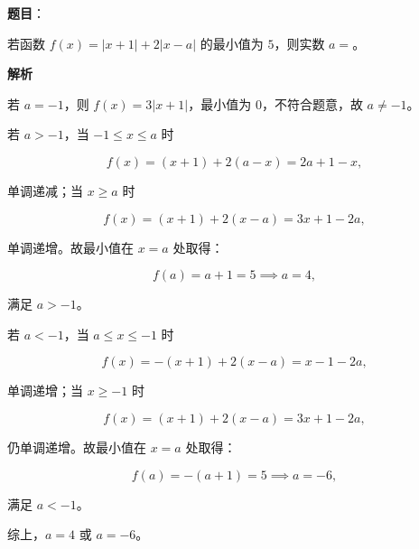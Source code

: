\begin{answer}

\textbf{题目}：

若函数 $f(x)=|x+1|+2|x-a|$ 的最小值为 $5$，则实数 $a=$\gkblank{}。

\textbf{解析}

若 $a=-1$，则 $f(x)=3|x+1|$，最小值为 $0$，不符合题意，故 $a\ne -1$。

若 $a>-1$，当 $-1\le x\le a$ 时

\nopagebreak[4]
\[
f(x)=(x+1)+2(a-x)=2a+1-x,
\]

单调递减；当 $x\ge a$ 时

\nopagebreak[4]
\[
f(x)=(x+1)+2(x-a)=3x+1-2a,
\]

单调递增。故最小值在 $x=a$ 处取得：

\nopagebreak[4]
\[
f(a)=a+1=5\implies a=4,
\]

满足 $a>-1$。

若 $a<-1$，当 $a\le x\le -1$ 时

\nopagebreak[4]
\[
f(x)=-(x+1)+2(x-a)=x-1-2a,
\]

单调递增；当 $x\ge -1$ 时

\nopagebreak[4]
\[
f(x)=(x+1)+2(x-a)=3x+1-2a,
\]

仍单调递增。故最小值在 $x=a$ 处取得：

\nopagebreak[4]
\[
f(a)=-(a+1)=5\implies a=-6,
\]

满足 $a<-1$。

综上，$a=4$ 或 $a=-6$。


\end{answer}

